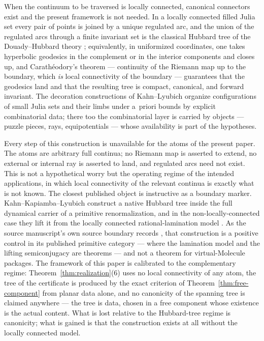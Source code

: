 \documentclass[11pt,reqno]{amsart}
\theoremstyle{definition}
\theoremstyle{remark}
\begin{document}
When the continuum to be traversed is locally connected, canonical
connectors exist and the present framework is not needed.  In a locally
connected filled Julia set every pair of points is joined by a unique
regulated arc, and the union of the regulated arcs through a finite
invariant set is the classical Hubbard tree of the
Douady--Hubbard theory \cite{DH85}; equivalently, in uniformized
coordinates, one takes hyperbolic geodesics in the complement or in the
interior components and closes up, and Carath\'eodory's theorem ---
continuity of the Riemann map up to the boundary, which \emph{is} local
connectivity of the boundary --- guarantees that the geodesics land and
that the resulting tree is compact, canonical, and forward invariant.
The decoration constructions of Kahn--Lyubich \cite{KL08} organize
configurations of small Julia sets and their limbs under a~priori bounds
by explicit combinatorial data; there too the combinatorial layer is
carried by objects --- puzzle pieces, rays, equipotentials --- whose
availability is part of the hypotheses.

Every step of this construction is unavailable for the atoms of the
present paper.  The atoms are arbitrary full continua; no Riemann map is
asserted to extend, no external or internal ray is asserted to land, and
regulated arcs need not exist.  This is not a hypothetical worry but the
operating regime of the intended applications, in which local
connectivity of the relevant continua is exactly what is not known.  The
closest published object is instructive as a boundary marker.
Kahn--Kapiamba--Lyubich construct a native Hubbard tree inside the full
dynamical carrier of a primitive renormalization, and in the
non-locally-connected case they lift it from the locally connected
rational-lamination model \cite[\S\S2.5--2.6]{KKL26}.  As the source
manuscript's own source boundary records \cite{MWman}, that construction
is a positive control in its published primitive category --- where the
lamination model and the lifting semiconjugacy are theorems --- and not a
theorem for virtual-Molecule packages.  The framework of this paper is
calibrated to the complementary regime: Theorem~\ref{thm:realization}(6)
uses no local connectivity of any atom, the tree of the certificate is
produced by the exact criterion of Theorem~\ref{thm:free-component} from
planar data alone, and no canonicity of the spanning tree is claimed
anywhere --- the tree is data, chosen in a free component whose existence
is the actual content.  What is lost relative to the Hubbard-tree regime
is canonicity; what is gained is that the construction exists at all
without the locally connected model.
\end{document}
